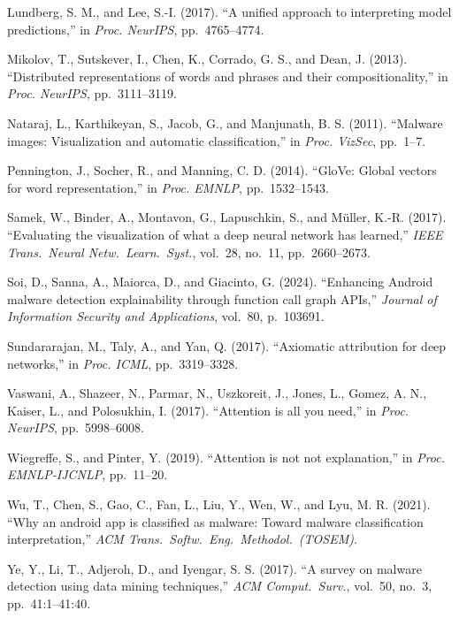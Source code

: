 \documentclass[12pt]{report}
\begin{document}
\begin{thebibliography}{}
Lundberg, S. M., and Lee, S.-I. (2017).
``A unified approach to interpreting model predictions,''
in \textit{Proc. NeurIPS}, pp.\ 4765--4774.

Mikolov, T., Sutskever, I., Chen, K., Corrado, G. S., and Dean, J. (2013).
``Distributed representations of words and phrases and their compositionality,''
in \textit{Proc. NeurIPS}, pp.\ 3111--3119.

Nataraj, L., Karthikeyan, S., Jacob, G., and Manjunath, B. S. (2011).
``Malware images: Visualization and automatic classification,''
in \textit{Proc. VizSec}, pp.\ 1--7.

Pennington, J., Socher, R., and Manning, C. D. (2014).
``GloVe: Global vectors for word representation,''
in \textit{Proc. EMNLP}, pp.\ 1532--1543.

Samek, W., Binder, A., Montavon, G., Lapuschkin, S., and M\"{u}ller, K.-R. (2017).
``Evaluating the visualization of what a deep neural network has learned,''
\textit{IEEE Trans.\ Neural Netw.\ Learn.\ Syst.}, vol.\ 28, no.\ 11, pp.\ 2660--2673.

Soi, D., Sanna, A., Maiorca, D., and Giacinto, G. (2024).
``Enhancing Android malware detection explainability through function call graph APIs,''
\textit{Journal of Information Security and Applications}, vol.\ 80, p.\ 103691.

Sundararajan, M., Taly, A., and Yan, Q. (2017).
``Axiomatic attribution for deep networks,''
in \textit{Proc. ICML}, pp.\ 3319--3328.

Vaswani, A., Shazeer, N., Parmar, N., Uszkoreit, J., Jones, L., Gomez, A. N., Kaiser, L., and Polosukhin, I. (2017).
``Attention is all you need,''
in \textit{Proc. NeurIPS}, pp.\ 5998--6008.

Wiegreffe, S., and Pinter, Y. (2019).
``Attention is not not explanation,''
in \textit{Proc. EMNLP-IJCNLP}, pp.\ 11--20.

Wu, T., Chen, S., Gao, C., Fan, L., Liu, Y., Wen, W., and Lyu, M. R. (2021).
``Why an android app is classified as malware: Toward malware classification interpretation,''
\textit{ACM Trans.\ Softw.\ Eng.\ Methodol.\ (TOSEM)}.

Ye, Y., Li, T., Adjeroh, D., and Iyengar, S. S. (2017).
``A survey on malware detection using data mining techniques,''
\textit{ACM Comput.\ Surv.}, vol.\ 50, no.\ 3, pp.\ 41:1--41:40.

\end{thebibliography}
\end{document}
